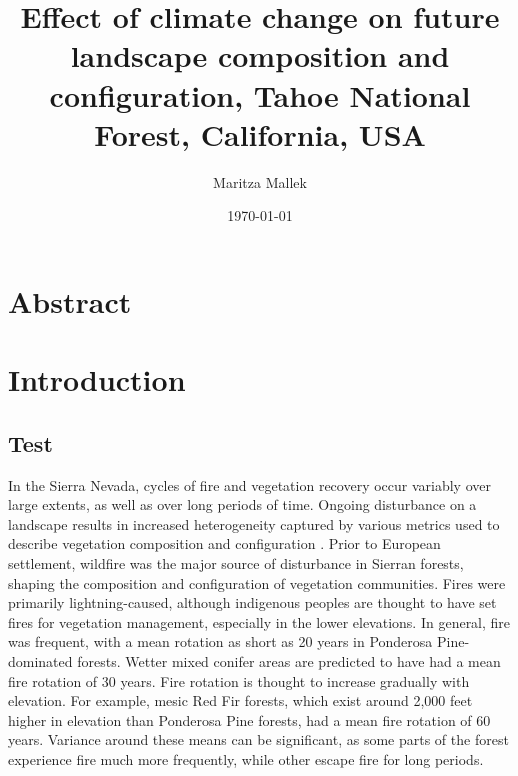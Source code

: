 \documentclass[12pt]{article}
\title{Effect of climate change on future landscape composition and configuration, Tahoe National Forest, California, USA}
\author{ Maritza Mallek }
\date{\today}
\begin{document}
\maketitle
\begin{spacing}{1}


\section*{Abstract}


\section*{Introduction}


\subsection{Test}
In the Sierra Nevada, cycles of fire and vegetation recovery occur variably over large extents, as well as over long periods of time. Ongoing disturbance on a landscape results in increased heterogeneity captured by various metrics used to describe vegetation composition and configuration \citep{Monica2008}. Prior to European settlement, wildfire was the major source of disturbance in Sierran forests, shaping the composition and configuration of vegetation communities. Fires were primarily lightning-caused, although indigenous peoples are thought to have set fires for vegetation management, especially in the lower elevations. In general, fire was frequent, with a mean rotation as short as 20 years in Ponderosa Pine-dominated forests. Wetter mixed conifer areas are predicted to have had a mean fire rotation of 30 years. Fire rotation is thought to increase gradually with elevation. For example, mesic Red Fir forests, which exist around 2,000 feet higher in elevation than Ponderosa Pine forests, had a mean fire rotation of 60 years. Variance around these means can be significant, as some parts of the forest experience fire much more frequently, while other escape fire for long periods. 


\end{spacing}
\end{document}
